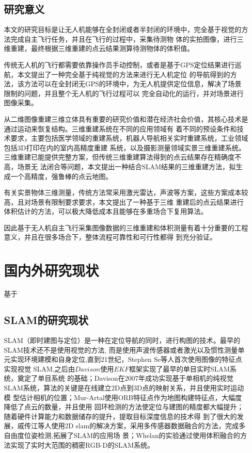 \subsection{研究意义}
\label{sec:1.1.2}
本文的研究目标是让无人机能够在全封闭或者半封闭的环境中，完全基于视觉的方法完成自主飞行任务，并且在飞行的过程中，采集待测物
体的实拍图像，进行三维重建，最终根据三维重建的点云结果测算待测物体的体积值。

传统无人机的飞行都需要依靠操作员手动控制，或者是基于GPS定位结果进行巡航，本文提出了一种完全基于纯视觉的方法来进行无人机定位
的导航得到的方法，该方法可以在全封闭无GPS的环境中，为无人机提供定位信息，解决了场景限制的问题，并且整个无人机的飞行过程可以
完全自动化的运行，并对场景进行图像采集。

从二维图像重建三维立体具有重要的研究价值和潜在经济社会价值，其核心技术是通过运动来恢复结构。三维重建系统在不同的应用领域有
着不同的预设条件和技术要求，主要包括医学领域的重建系统，机器人导航相关实时重建系统，工业领域包括3D打印在内的室内高精度重建
系统，以及摄影测量领域实景三维重建系统。 三维重建已能提供完整方案，但传统三维重建算法得到的点云结果存在精确度不高，场景无
法闭合等问题，本文提出一种结合SLAM结果的三维重建方法，拟生成一个高精度，强鲁棒的点云地图。

有关实景物体三维测量，传统方法常采用激光雷达，声波等方案，这些方案成本较高，且对场景有限制要求要求，本文提出了一种基于三维
重建后的点云结果进行体积估计的方法，可以极大降低成本且能够在多重场合下复用算法。

因此基于无人机自主飞行采集图像数据的三维重建和体积测量有着十分重要的工程意义，并且在很多场合下，整体流程可靠性和可行性都得
到充分验证。


\section{国内外研究现状}
\label{sec:1.2}
基于
\subsection{SLAM的研究现状}
\label{sec:1.2.1}
SLAM（即时建图与定位）是一种在定位导航的同时，进行构图的技术\cite{cadena2016past}。最早的SLAM技术还不是使用视觉的方法,
而是使用声波传感器或者激光以及惯性测量单元实现环境建模和自身定位,直到21世纪，Stephen Se等人首次使用图像的特征点实现视觉
SLAM\cite{se2002mobile},之后由$Davison$使用$EKF$框架实现了最早的单目实时SLAM系统\cite{davison2003real}，奠定了单目系统
的基础；Davison在2007年成功实现基于单相机的纯视觉SLAM系统，算法的关键是在线建立2D点到3D点的映射关系，并且使用实时运动模
型估计相机的位置\cite{davison2007monoslam}；Mur-Artal使用ORB特征点作为地图构建特征点，大幅度降低了点云的数量，并且使用
回环检测的方法使定位与建图的精度都大幅提升\cite{mur2015orb}；随着硬件计算能力和数据储存的提升，提取目标深度信息的技术得
到了很大的发展，戚传江等人使用2D slam的解决方案，采用多传感器数据融合的方法，完成多自由度位姿检测,拓展了SLAM的应用场
景；Whelan的实验通过使用体积融合的方法实现了实时大范围的稠密RGB-D的SLAM系统\cite{whelan2015real}。

